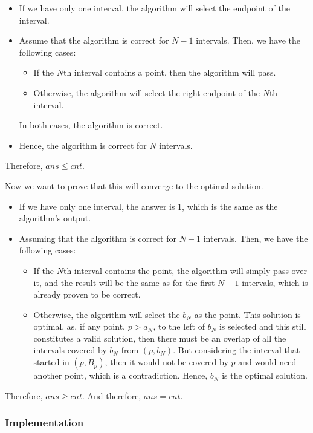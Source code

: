 \documentclass{article}
\begin{document}
\begin{itemize}
    \item If we have only one interval, the algorithm will select the endpoint of the interval.
    \item Assume that the algorithm is correct for $N-1$ intervals. Then, we have the following cases:
    \begin{itemize}
        \item If the $N$th interval contains a point, then the algorithm will pass.
        \item Otherwise, the algorithm will select the right endpoint of the $N$th interval.
    \end{itemize}
    In both cases, the algorithm is correct.
    \item Hence, the algorithm is correct for $N$ intervals.
\end{itemize}

Therefore, $ans \le cnt$.

Now we want to prove that this will converge to the optimal solution.

\begin{itemize}
    \item If we have only one interval, the answer is $1$, which is the same as the algorithm's output.
    \item Assuming that the algorithm is correct for $N-1$ intervals. Then, we have the following cases:
    \begin{itemize}
        \item If the $N$th interval contains the point, the algorithm will simply pass over it, and the result will be the same as for the first $N-1$ intervals, which is already proven to be correct.
        \item Otherwise, the algorithm will select the $b_N$ as the point. This solution is optimal, as, if any point, $p > a_N$, to the left of $b_N$ is selected and this still constitutes a valid solution, then there must be an overlap of all the intervals covered by $b_N$ from $(p, b_N)$. But considering the interval that started in $(p, B_p)$, then it would not be covered by $p$ and would need another point, which is a contradiction. Hence, $b_N$ is the optimal solution.
    \end{itemize}
\end{itemize}

Therefore, $ans \ge cnt$. And therefore, $ans = cnt$.

\subsubsection{Implementation}
\end{document}
